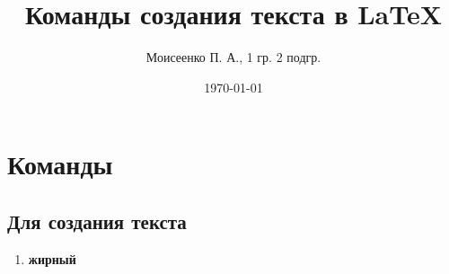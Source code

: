 \documentclass[a4paper,12pt]{article} %
\author{Моисеенко П. А., 1 гр. 2 подгр.} %
\title{Команды создания текста в \LaTeX{}} %
\date{\today} %
\begin{document}
\maketitle %
\newpage %
\section{Команды} %
\subsection{Для создания текста} %
\begin{enumerate} %
\item \textbf{жирный} %

\end{enumerate} %
\end{document}
